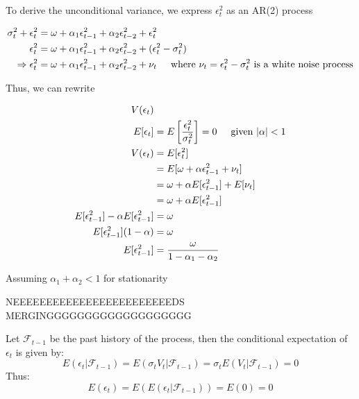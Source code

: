 \documentclass{article}
\begin{document}
To derive the unconditional variance, we express $\epsilon_t^2$ as an AR(2) process 

\begin{align*}
\sigma_t^2 + \epsilon_t^2 &= \omega + \alpha_1 \epsilon_{t-1}^2 + \alpha_2 \epsilon_{t-2}^2 + \epsilon_t^2 \\
\epsilon_t^2 &= \omega + \alpha_1 \epsilon_{t-1}^2 + \alpha_2 \epsilon_{t-2}^2 + (\epsilon_t^2 - \sigma_t^2) \\
\Rightarrow \epsilon_t^2 &= \omega + \alpha_1 \epsilon_{t-1}^2 + \alpha_2 \epsilon_{t-2}^2 + \nu_t \hspace{5mm} \text{where} \ \nu_t = \epsilon_t^2 - \sigma_t^2 \ \text{is a white noise process}  
\end{align*}

Thus, we can rewrite 

\begin{align*}
V(\epsilon_t) & \\
E[\epsilon_t] &= E\left[ \frac{\epsilon_t^2}{\sigma_t^2} \right] = 0 \hspace{5mm} \text{given } |\alpha| < 1 \\
V(\epsilon_t) &= E[\epsilon_t^2] \\
&= E[\omega + \alpha \epsilon_{t-1}^2 + \nu_t] \\
&= \omega + \alpha E[\epsilon_{t-1}^2] + E[\nu_t] \\
&= \omega + \alpha E[\epsilon_{t-1}^2] \\
E[\epsilon_{t-1}^2] - \alpha E[\epsilon_{t-1}^2] &= \omega \\
E[\epsilon_{t-1}^2] (1 - \alpha) &= \omega \\
E[\epsilon_{t-1}^2] &= \frac{\omega}{1 - \alpha_1 - \alpha_2}
\end{align*}

Assuming $\alpha_1 + \alpha_2 < 1$ for stationarity

NEEEEEEEEEEEEEEEEEEEEEEEEDS MERGINGGGGGGGGGGGGGGGGGGG

Let \( \mathcal{F}_{t-1} \) be the past history of the process, then the conditional expectation of \( \epsilon_t \) is given by:
\begin{equation}
E(\epsilon_t | \mathcal{F}_{t-1}) = E(\sigma_t V_t | \mathcal{F}_{t-1}) = \sigma_t E(V_t | \mathcal{F}_{t-1}) = 0
\end{equation}
Thus:
\begin{equation}
E(\epsilon_t) = E(E(\epsilon_t | \mathcal{F}_{t-1})) = E(0) = 0
\end{equation}
\end{document}
